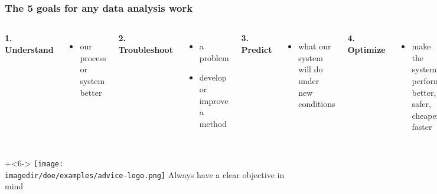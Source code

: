 \documentclass[11pt,aspectratio=169,mathserif]{beamer}
\begin{document}
\begin{frame}\frametitle{The 5 goals for any data analysis work}

	\begin{columns}[t]
		
			\vspace{-12pt}
			\textbf{{\color{purple} 1. Understand}}
			\begin{itemize}
				\item	our process or system better\pause
			\end{itemize}

			\textbf{{\color{purple} 2. Troubleshoot}}
			\begin{itemize}
				\item	a problem
				\item	develop or improve a method\pause
			\end{itemize}

			\textbf{{\color{purple} 3. Predict}}
			\begin{itemize}
				\item	what our system will do under new conditions\pause
			\end{itemize}

			\textbf{{\color{purple} 4. Optimize}}
			\begin{itemize}
				\item	make the system perform better, safer, cheaper, faster\pause
			\end{itemize}

			\textbf{{\color{purple} 5. Monitor}}
			\begin{itemize}
				\item	ensure we keep the gains we have made\pause
			\end{itemize}
			
			\onslide+<3->{
				\texttt{[image: \\imagedir/examples/reactor-design-example/response-surface.png]}
			}
			\onslide+<5->{
				\texttt{[image: \\imagedir/monitoring/Kappa-phaseII-testing.png]}
			}
			
	\end{columns}
	
	\onslide+<6->{
		\hfill \texttt{[image: \\imagedir/doe/examples/advice-logo.png]} {\color{blue}Always have a clear objective in mind}
	}

\end{frame}
\end{document}
